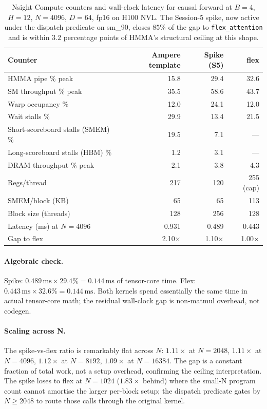 \begin{table}[h]
\centering
\small
\begin{tabular}{lrrr}
\toprule
\textbf{Counter} & \textbf{Ampere template} & \textbf{Spike (S5)} & \textbf{flex} \\
\midrule
HMMA pipe \% peak                   & 15.8  & 29.4  & 32.6 \\
SM throughput \% peak               & 35.5  & 58.6  & 43.7 \\
Warp occupancy \%                   & 12.0  & 24.1  & 12.0 \\
Wait stalls \%                      & 29.9  & 13.4  & 21.5 \\
Short-scoreboard stalls (SMEM) \%   & 19.5  &  7.1  & ---  \\
Long-scoreboard stalls (HBM) \%     &  1.2  &  3.1  & ---  \\
DRAM throughput \% peak             &  2.1  &  3.8  &  4.3 \\
Regs/thread                         & 217   & 120   & 255 (cap) \\
SMEM/block (KB)                     &  65   &  65   & 113  \\
Block size (threads)                & 128   & 256   & 128  \\
\midrule
Latency (ms) at $N{=}4096$          & 0.931 & 0.489 & 0.443 \\
Gap to flex                         & 2.10$\times$ & 1.10$\times$ & 1.00$\times$ \\
\bottomrule
\end{tabular}
\caption{Nsight Compute counters and wall-clock latency for causal
forward at $B{=}4$, $H{=}12$, $N{=}4096$, $D{=}64$, fp16 on H100 NVL.
The Session-5 spike, now active under the dispatch predicate on sm\_90,
closes $85\%$ of the gap to \texttt{flex\_attention} and is within
$3.2$ percentage points of HMMA's structural ceiling at this shape.}
\label{tab:hopper_session5}
\end{table}

\paragraph{Algebraic check.} Spike: $0.489\,\text{ms} \times 29.4\% = 0.144\,\text{ms}$
of tensor-core time. Flex: $0.443\,\text{ms} \times 32.6\% = 0.144\,\text{ms}$.
Both kernels spend essentially the same time in actual tensor-core
math; the residual wall-clock gap is non-matmul overhead, not codegen.

\paragraph{Scaling across N.} The spike-vs-flex ratio is remarkably
flat across $N$: $1.11\times$ at $N{=}2048$, $1.11\times$ at $N{=}4096$,
$1.12\times$ at $N{=}8192$, $1.09\times$ at $N{=}16384$. The gap is a
constant fraction of total work, not a setup overhead, confirming the
ceiling interpretation. The spike loses to flex at $N{=}1024$
($1.83\times$ behind) where the small-N program count cannot amortise
the larger per-block setup; the dispatch predicate gates by $N \geq 2048$
to route those calls through the original kernel.

